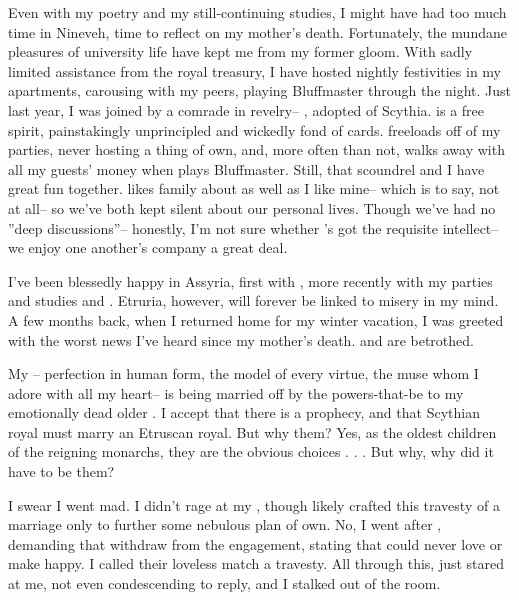 \documentclass[char]{Kos}
\begin{document}
Even with my poetry and my still-continuing studies, I might have had too much time in Nineveh, time to reflect on my mother's death. Fortunately, the mundane pleasures of university life have kept me from my former gloom. With sadly limited assistance from the royal treasury, I have hosted nightly festivities in my apartments, carousing with my peers, playing Bluffmaster through the night. Just last year, I was joined by a comrade in revelry-- \cWard{}, adopted \cWard{\prince} of Scythia. \cWard{} is a free spirit, painstakingly unprincipled and wickedly fond of cards. \cWard{\They} freeloads off of my parties, never hosting a thing of \cWard{\their} own, and, more often than not, \cWard{\they} walks away with all my guests' money when \cWard{\they} plays Bluffmaster. Still, that scoundrel and I have great fun together. \cWard{} likes \cWard{\their} family about as well as I like mine-- which is to say, not at all-- so we've both kept silent about our personal lives. Though we've had no ''deep discussions''-- honestly, I'm not sure whether \cWard{\they}'s got the requisite intellect-- we enjoy one another's company a great deal.

I've been blessedly happy in Assyria, first with \cBride{}, more recently with my parties and studies and \cWard{}. Etruria, however, will forever be linked to misery in my mind. A few months back, when I returned home for my winter vacation, I was greeted with the worst news I've heard since my mother's death. \cBride{} and \cGroom{} are betrothed.

My \cBride{}-- perfection in human form, the model of every virtue, the muse whom I adore with all my heart-- is being married off by the powers-that-be to my emotionally dead older \cGroom{\sibling}. I accept that there is a prophecy, and that Scythian royal must marry an Etruscan royal. But why them? Yes, as the oldest children of the reigning monarchs, they are the obvious choices . . . But why, why did it have to be them? 

I swear I went mad. I didn't rage at my \cEtruriaKing{\parent}, though \cEtruriaKing{\they} likely crafted this travesty of a marriage only to further some nebulous plan of \cScythiaKing{\their} own. No, I went after \cGroom{}, demanding that \cGroom{\they} withdraw from the engagement, stating that \cGroom{\they} could never love \cBride{} or make \cBride{\them} happy. I called their loveless match a travesty. All through this, \cGroom{\they} just stared at me, not even condescending to reply, and I stalked out of the room.
\end{document}
